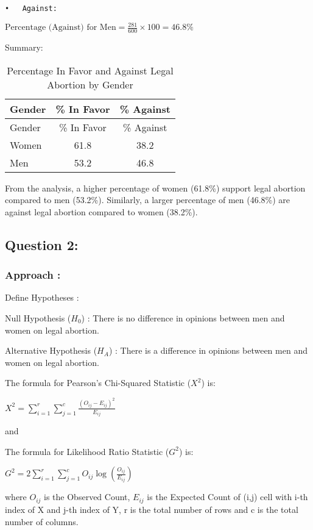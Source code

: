 \documentclass[
]{article}
\begin{document}
\begin{verbatim}
•   Against:
\end{verbatim}

\({\text{Percentage (Against) for Men} = \frac{281}{600} \times 100 = 46.8\%}\)

Summary:

\begin{longtable}[]{@{}lcc@{}}
\caption{Percentage In Favor and Against Legal Abortion by
Gender}\tabularnewline
\toprule\noalign{}
Gender & \% In Favor & \% Against \\
\midrule\noalign{}
\endfirsthead
\toprule\noalign{}
Gender & \% In Favor & \% Against \\
\midrule\noalign{}
\endhead
\bottomrule\noalign{}
\endlastfoot
Women & 61.8 & 38.2 \\
Men & 53.2 & 46.8 \\
\end{longtable}

From the analysis, a higher percentage of women (61.8\%) support legal
abortion compared to men (53.2\%). Similarly, a larger percentage of men
(46.8\%) are against legal abortion compared to women (38.2\%).

\subsection{Question 2:}\label{question-2}

\subsubsection{Approach :}\label{approach}

Define Hypotheses :

Null Hypothesis (\({H_0}\)) : There is no difference in opinions between
men and women on legal abortion.

Alternative Hypothesis (\({H_A}\)) : There is a difference in opinions
between men and women on legal abortion.

The formula for Pearson's Chi-Squared Statistic (\({X^2}\)) is:

\({X^2 = \sum_{i=1}^{r} \sum_{j=1}^{c} \frac{(O_{ij} - E_{ij})^2}{E_{ij}}}\)

and

The formula for Likelihood Ratio Statistic (\({G^2}\)) is:

\({G^2 = 2 \sum_{i=1}^{r} \sum_{j=1}^{c} O_{ij} \log\left(\frac{O_{ij}}{E_{ij}}\right)}\)

where \({O_{ij}}\) is the Observed Count, \({E_{ij}}\) is the Expected
Count of (i,j) cell with i-th index of X and j-th index of Y, r is the
total number of rows and c is the total number of columns.
\end{document}

